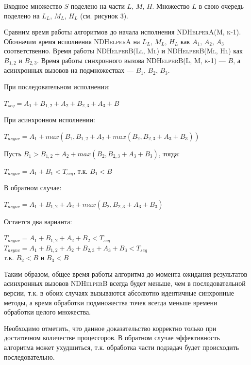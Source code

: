 Входное множество $S$ поделено на части $L$, $M$, $H$. Множество $L$ в свою очередь поделено на $L_L$, $M_L$, $H_L$ (см. рисунок 3).

Сравним время работы алгоритмов до начала исполнения \textsc{NDHelperA(M, k-1)}.
Обозначим время исполнения \textsc{NDHelperA} на $L_L$, $M_L$, $H_L$ как $A_1$, $A_2$, $A_3$ соответственно.
Время работы \textsc{NDHelperB(Ll, Ml)} и \textsc{NDHelperB(Ml, Hl)} как $B_{1,2}$ и $B_{2,3}$.
Время работы синхронного вызова \textsc{NDHelperB(L, M, k-1)} --- $B$, а асинхронных вызовов на подмножествах --- $B_1$, $B_2$, $B_3$.

При последовательном исполнении:
\begin{center}
    $T_{seq} = A_1 + B_{1,2} + A_2 + B_{2,3} + A_3 + B$
\end{center}

При асинхронном исполнении:
\begin{center}
    $T_{async} = A_1 + max(B_1, B_{1,2} + A_2 + max(B_2, B_{2,3} + A_3 + B_3))$\\
\end{center}

Пусть $B_1 > B_{1,2} + A_2 + max(B_2, B_{2,3} + A_3 + B_3)$, тогда:
\begin{center}
    $T_{async} = A_1 + B_1 < T_{seq}$, т.к. $B_1 < B$
\end{center}

В обратном случае:
\begin{center}
    $T_{async} = A_1 + B_{1,2} + A_2 + max(B_2, B_{2,3} + A_3 + B_3)$
\end{center}

Остается два варианта:
\begin{center}
    $T_{async} = A_1 + B_{1,2} + A_2 + B_2 < T_{seq}$\\
    $T_{async} = A_1 + B_{1,2} + A_2 + B_{2,3} + A_3 + B_3 < T_{seq}$\\
    т.к. $B_2 < B$ и $B_3 < B$
\end{center}

Таким образом, общее время работы алгоритма до момента ожидания результатов асинхронных вызовов \textsc{NDHelperB} всегда будет меньше, чем в последовательной версии, т.к. в обоих случаях вызываются абсолютно идентичные синхронные методы, а время обработки подмножества точек всегда меньше времени обработки целого множества.

Необходимо отметить, что данное доказательство корректно только при достаточном количестве процессоров.
В обратном случае эффективность алгоритма может ухудшиться, т.к. обработка части подзадач будет происходить последовательно.

